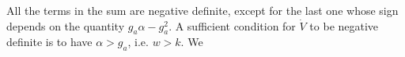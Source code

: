 All the terms in the sum are negative definite, except for the last one whose sign depends on the quantity $g_a\alpha-g_a^2$. A sufficient condition for $\dot V$ to be negative definite is to have $\alpha > g_a$, i.e. $w>k$.  We





